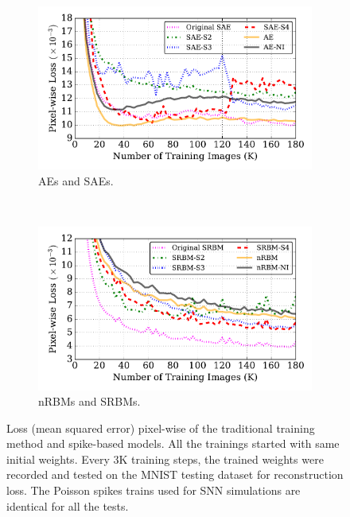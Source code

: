 \DIFdelend \DIFaddbegin \label{subsec:MNIST_recon}
\DIFaddend \begin{figure}
	\centering
	\begin{subfigure}[t]{0.8\textwidth}
		\includegraphics[width=\textwidth]{pics_sdlm/53_MNIST_SRBM_all/compare_recon.pdf}
		\caption{AEs and SAEs.}
	\end{subfigure}\\
	\begin{subfigure}[t]{0.8\textwidth}
		\includegraphics[width=\textwidth]{pics_sdlm/53_MNIST_SRBM_all/compare_recon_rbm.pdf}
		\caption{nRBMs and SRBMs.}
	\end{subfigure}
	\DIFdelbeginFL %
\DIFdelendFL \DIFaddbeginFL \caption[Comparisons of loss between conventional and spiking models.]{\DIFaddendFL Loss (mean squared error) pixel-wise of the traditional training method and spike-based models. All the trainings started with same initial weights. Every 3K training steps, the trained weights were recorded and tested on the MNIST testing dataset for reconstruction loss. The Poisson spikes trains used for SNN simulations are identical for all the tests.}
	\label{fig:sdlm_loss}
\end{figure}

